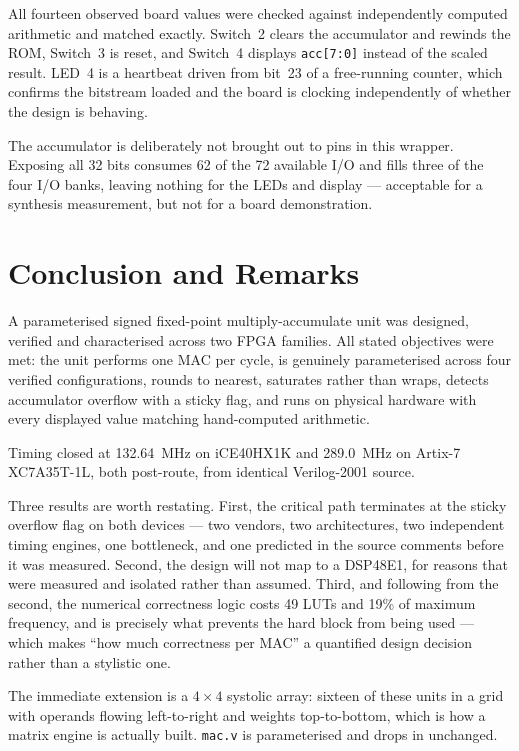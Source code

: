 \documentclass[letterpaper,12pt]{article}
\begin{document}
All fourteen observed board values were checked against independently computed
arithmetic and matched exactly. Switch~2 clears the accumulator and rewinds the
ROM, Switch~3 is reset, and Switch~4 displays \texttt{acc[7:0]} instead of the
scaled result. LED~4 is a heartbeat driven from bit~23 of a free-running
counter, which confirms the bitstream loaded and the board is clocking
independently of whether the design is behaving.

The accumulator is deliberately not brought out to pins in this wrapper.
Exposing all 32 bits consumes 62 of the 72 available I/O and fills three of the
four I/O banks, leaving nothing for the LEDs and display --- acceptable for a
synthesis measurement, but not for a board demonstration.

\section{Conclusion and Remarks}

A parameterised signed fixed-point multiply-accumulate unit was designed,
verified and characterised across two FPGA families. All stated objectives were
met: the unit performs one MAC per cycle, is genuinely parameterised across
four verified configurations, rounds to nearest, saturates rather than wraps,
detects accumulator overflow with a sticky flag, and runs on physical hardware
with every displayed value matching hand-computed arithmetic.

Timing closed at 132.64~MHz on iCE40HX1K and 289.0~MHz on Artix-7
XC7A35T-1L, both post-route, from identical Verilog-2001 source.

Three results are worth restating. First, the critical path terminates at the
sticky overflow flag on both devices --- two vendors, two architectures, two
independent timing engines, one bottleneck, and one predicted in the source
comments before it was measured. Second, the design will not map to a DSP48E1,
for reasons that were measured and isolated rather than assumed. Third, and
following from the second, the numerical correctness logic costs 49 LUTs and
19\% of maximum frequency, and is precisely what prevents the hard block from
being used --- which makes ``how much correctness per MAC'' a quantified design
decision rather than a stylistic one.

The immediate extension is a $4\times4$ systolic array: sixteen of these units
in a grid with operands flowing left-to-right and weights top-to-bottom, which
is how a matrix engine is actually built. \texttt{mac.v} is parameterised and
drops in unchanged.
\end{document}
